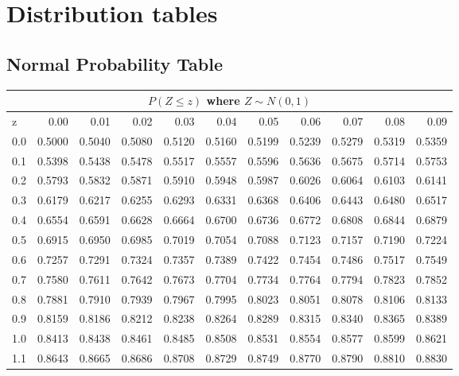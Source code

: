 \singlespacing

\chapter{Distribution tables}
\label{distributionTables}

\section{Normal Probability Table}
\label{normalProbabilityTable}
\begin{center}
\begin{tabular}{|l|*{10}{r}|}
\hline \multicolumn{11}{|c|}{$P(Z\leq z)$ where $Z\sim N(0,1)$} \\
\hline z &  0.00 &  0.01 &  0.02 &  0.03 &  0.04 &  0.05 &  0.06 &  0.07 &  0.08 &  0.09\\ 
\hline 
0.0 &  0.5000 &  0.5040 &  0.5080 &  0.5120 &  0.5160 &  0.5199 &  0.5239 &  0.5279 &  0.5319 &  0.5359\\ 
0.1 &  0.5398 &  0.5438 &  0.5478 &  0.5517 &  0.5557 &  0.5596 &  0.5636 &  0.5675 &  0.5714 &  0.5753\\ 
0.2 &  0.5793 &  0.5832 &  0.5871 &  0.5910 &  0.5948 &  0.5987 &  0.6026 &  0.6064 &  0.6103 &  0.6141\\ 
0.3 &  0.6179 &  0.6217 &  0.6255 &  0.6293 &  0.6331 &  0.6368 &  0.6406 &  0.6443 &  0.6480 &  0.6517\\ 
0.4 &  0.6554 &  0.6591 &  0.6628 &  0.6664 &  0.6700 &  0.6736 &  0.6772 &  0.6808 &  0.6844 &  0.6879\\ 
0.5 &  0.6915 &  0.6950 &  0.6985 &  0.7019 &  0.7054 &  0.7088 &  0.7123 &  0.7157 &  0.7190 &  0.7224\\ 
0.6 &  0.7257 &  0.7291 &  0.7324 &  0.7357 &  0.7389 &  0.7422 &  0.7454 &  0.7486 &  0.7517 &  0.7549\\ 
0.7 &  0.7580 &  0.7611 &  0.7642 &  0.7673 &  0.7704 &  0.7734 &  0.7764 &  0.7794 &  0.7823 &  0.7852\\ 
0.8 &  0.7881 &  0.7910 &  0.7939 &  0.7967 &  0.7995 &  0.8023 &  0.8051 &  0.8078 &  0.8106 &  0.8133\\ 
0.9 &  0.8159 &  0.8186 &  0.8212 &  0.8238 &  0.8264 &  0.8289 &  0.8315 &  0.8340 &  0.8365 &  0.8389\\ 
1.0 &  0.8413 &  0.8438 &  0.8461 &  0.8485 &  0.8508 &  0.8531 &  0.8554 &  0.8577 &  0.8599 &  0.8621\\ 
1.1 &  0.8643 &  0.8665 &  0.8686 &  0.8708 &  0.8729 &  0.8749 &  0.8770 &  0.8790 &  0.8810 &  0.8830\\ 

\end{tabular}
\end{center}
